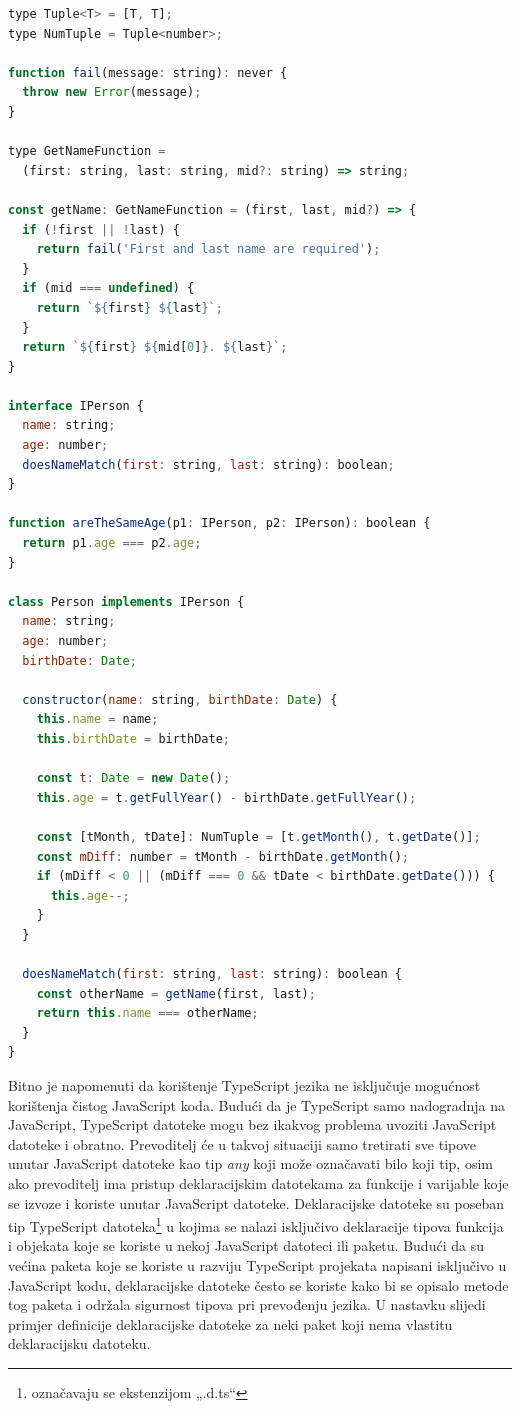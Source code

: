\documentclass[times, utf8, diplomski, numeric]{fer}
\newcommand{\razmakp}{\vspace{18pt}}
\newcommand{\razmaks}{\vspace{10pt}}
\begin{document}
\razmakp %
\begin{lstlisting}[language=JavaScript, caption={Primjer definiranja i korištenja TypeScript tipova}, label={lst:typescript}]
type Tuple<T> = [T, T];
type NumTuple = Tuple<number>;

function fail(message: string): never {
  throw new Error(message);
}

type GetNameFunction =
  (first: string, last: string, mid?: string) => string;

const getName: GetNameFunction = (first, last, mid?) => {
  if (!first || !last) {
    return fail('First and last name are required');
  }
  if (mid === undefined) {
    return `${first} ${last}`;
  }
  return `${first} ${mid[0]}. ${last}`;
}

interface IPerson {
  name: string;
  age: number;
  doesNameMatch(first: string, last: string): boolean;
}

function areTheSameAge(p1: IPerson, p2: IPerson): boolean {
  return p1.age === p2.age;
}

class Person implements IPerson {
  name: string;
  age: number;
  birthDate: Date;

  constructor(name: string, birthDate: Date) {
    this.name = name;
    this.birthDate = birthDate;
  
    const t: Date = new Date();
    this.age = t.getFullYear() - birthDate.getFullYear();

    const [tMonth, tDate]: NumTuple = [t.getMonth(), t.getDate()];
    const mDiff: number = tMonth - birthDate.getMonth();
    if (mDiff < 0 || (mDiff === 0 && tDate < birthDate.getDate())) {
      this.age--;
    }
  }

  doesNameMatch(first: string, last: string): boolean {
    const otherName = getName(first, last);
    return this.name === otherName;
  }
}

\end{lstlisting}
\razmaks

Bitno je napomenuti da korištenje TypeScript jezika ne isključuje mogućnost korištenja čistog JavaScript koda.
Budući da je TypeScript samo nadogradnja na JavaScript, TypeScript datoteke mogu bez ikakvog problema uvoziti  JavaScript datoteke i obratno.
Prevoditelj će u takvoj situaciji samo tretirati sve tipove unutar JavaScript datoteke kao tip \emph{any} koji može označavati bilo koji tip, osim ako prevoditelj ima pristup deklaracijskim datotekama  za funkcije i varijable koje se izvoze  i koriste unutar JavaScript datoteke.
Deklaracijske datoteke su poseban tip TypeScript datoteka\footnote{označavaju se ekstenzijom „.d.ts“} u kojima se nalazi isključivo deklaracije tipova funkcija i objekata koje se koriste u nekoj JavaScript datoteci ili paketu.\citep{ts_hand}
Budući da su većina paketa koje se koriste u razviju TypeScript projekata napisani isključivo u JavaScript kodu, deklaracijske datoteke često se koriste kako bi se opisalo metode tog paketa i održala sigurnost tipova pri prevođenju jezika.
U nastavku slijedi primjer definicije deklaracijske datoteke za neki paket koji nema vlastitu deklaracijsku datoteku.
\end{document}
